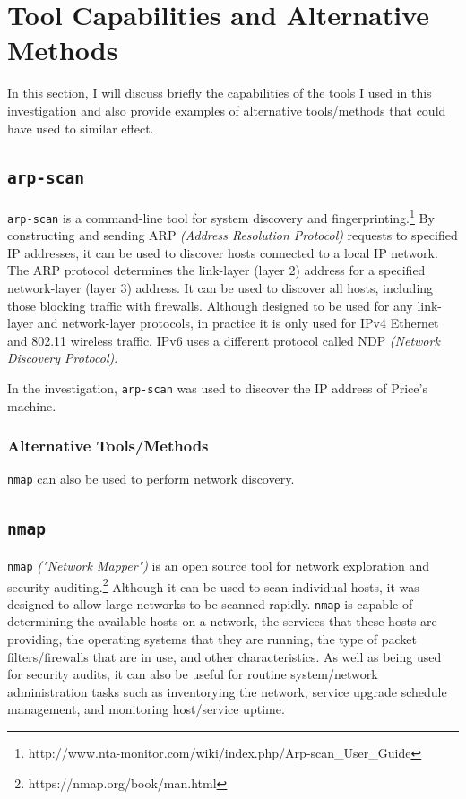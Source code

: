 \documentclass[12pt]{report}
\newcommand{\term}[1]{\colorbox{light-gray}{\texttt{#1}}}
\begin{document}
\pagebreak
\chapter{Tool Capabilities and Alternative Methods}
In this section, I will discuss briefly the capabilities of the tools I used in this investigation and also provide examples of alternative tools/methods that could have used to similar effect.

\section{\texttt{arp-scan}}
\texttt{arp-scan} is a command-line tool for system discovery and fingerprinting.\footnote{http://www.nta-monitor.com/wiki/index.php/Arp-scan\_User\_Guide} By constructing and sending ARP \textit{(Address Resolution Protocol)} requests to specified IP addresses, it can be used to discover hosts connected to a local IP network. The ARP protocol determines the link-layer (layer 2) address for a specified network-layer (layer 3) address. It can be used to discover all hosts, including those blocking traffic with firewalls. Although designed to be used for any link-layer and network-layer protocols, in practice it is only used for IPv4 Ethernet and 802.11 wireless traffic. IPv6 uses a different protocol called NDP \textit{(Network Discovery Protocol)}.

In the investigation, \texttt{arp-scan} was used to discover the IP address of Price's machine.
\subsection*{Alternative Tools/Methods}
\texttt{nmap} can also be used to perform network discovery.

\section{\texttt{nmap}}
\texttt{nmap} \textit{("Network Mapper")} is an open source tool for network exploration and security auditing.\footnote{https://nmap.org/book/man.html} Although it can be used to scan individual hosts, it was designed to allow large networks to be scanned rapidly. \texttt{nmap} is capable of determining the available hosts on a network, the services that these hosts are providing, the operating systems that they are running, the type of packet filters/firewalls that are in use, and other characteristics. As well as being used for security audits, it can also be useful for routine system/network administration tasks such as inventorying the network, service upgrade schedule management, and monitoring host/service uptime.
\end{document}
